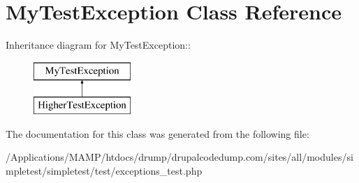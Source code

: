 \hypertarget{class_my_test_exception}{
\section{MyTestException Class Reference}
\label{class_my_test_exception}
}
Inheritance diagram for MyTestException::\begin{figure}[H]
\begin{center}
\leavevmode
\includegraphics[height=2cm]{class_my_test_exception}
\end{center}
\end{figure}


The documentation for this class was generated from the following file:\begin{DoxyCompactItemize}
\item 
/Applications/MAMP/htdocs/drump/drupalcodedump.com/sites/all/modules/simpletest/simpletest/test/exceptions\_\-test.php\end{DoxyCompactItemize}
